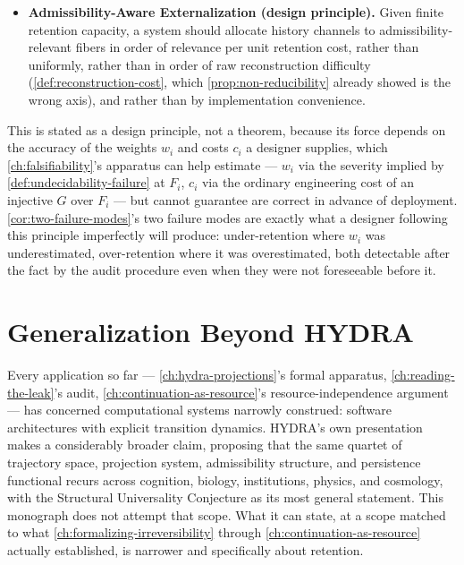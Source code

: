 \documentclass[11pt]{book}
\theoremstyle{plain}
\theoremstyle{definition}
\theoremstyle{remark}
\begin{document}
\begin{itemize}
\item[] \textbf{Admissibility-Aware Externalization (design principle).}
Given finite retention capacity, a system should allocate history
channels to admissibility-relevant fibers in order of relevance per
unit retention cost, rather than uniformly, rather than in order of
raw reconstruction difficulty (\cref{def:reconstruction-cost}, which
\cref{prop:non-reducibility} already showed is the wrong axis), and
rather than by implementation convenience.
\end{itemize}

This is stated as a design principle, not a theorem, because its
force depends on the accuracy of the weights $w_i$ and costs $c_i$ a
designer supplies, which \cref{ch:falsifiability}'s apparatus can help
estimate --- $w_i$ via the severity implied by
\cref{def:undecidability-failure} at $F_i$, $c_i$ via the ordinary
engineering cost of an injective $G$ over $F_i$ --- but cannot
guarantee are correct in advance of deployment. \cref{cor:two-failure-modes}'s
two failure modes are exactly what a designer following this principle
imperfectly will produce: under-retention where $w_i$ was
underestimated, over-retention where it was overestimated, both
detectable after the fact by the audit procedure even when they were
not foreseeable before it.

\section{Generalization Beyond HYDRA}

Every application so far --- \cref{ch:hydra-projections}'s formal
apparatus, \cref{ch:reading-the-leak}'s audit,
\cref{ch:continuation-as-resource}'s resource-independence argument
--- has concerned computational systems narrowly construed: software
architectures with explicit transition dynamics. HYDRA's own
presentation makes a considerably broader claim, proposing that the
same quartet of trajectory space, projection system, admissibility
structure, and persistence functional recurs across cognition,
biology, institutions, physics, and cosmology, with the Structural
Universality Conjecture as its most general statement. This monograph
does not attempt that scope. What it can state, at a scope matched to
what \cref{ch:formalizing-irreversibility} through
\cref{ch:continuation-as-resource} actually established, is narrower
and specifically about retention.
\end{document}
